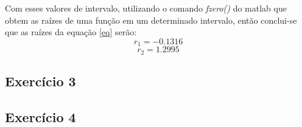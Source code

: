\documentclass[12pt]{article}
\begin{document}
Com esses valores de intervalo, utilizando o comando \emph{fzero()} do matlab que obtem as raízes de uma função
em um determinado intervalo, então conclui-se que as raízes da equação \ref{eq} serão:
\[r_1 =  -0.1316\] 
\[ r_2 =  1.2995\]

\subsection{Exercício 3}

\subsection{Exercício 4}
\end{document}
